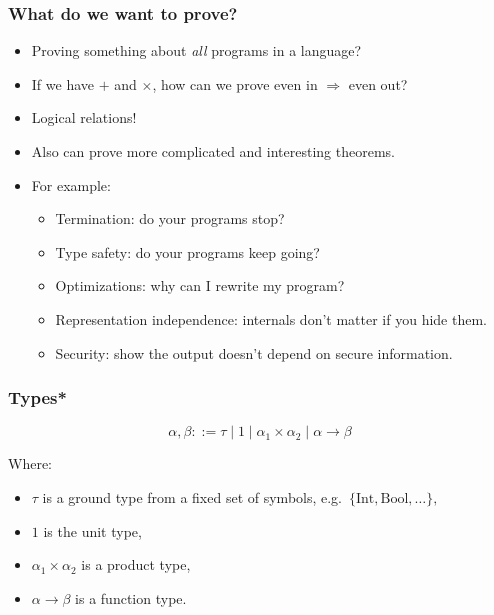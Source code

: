 \documentclass[aspectratio=169]{beamer}
\begin{document}
\begin{frame}
\frametitle{What do we want to prove?}

\pause
\begin{itemize}
    \item Proving something about \emph{all} programs in a language?
    \pause
    \item If we have $+$ and $\times$, how can we prove even in $\Rightarrow$ even out?
    \pause
    \item Logical relations!
    \pause
    \item Also can prove more complicated and interesting theorems.
    \pause
    \item For example:
    \begin{itemize}
        \pause
        \item Termination: do your programs stop?
        \pause
        \item Type safety: do your programs keep going?
        \pause
        \item Optimizations: why can I rewrite my program?
        \pause
        \item Representation independence: internals don't matter if you hide them.
        \pause
        \item Security: show the output doesn't depend on secure information.
    \end{itemize}
\end{itemize}
\end{frame}

\begin{frame}
\frametitle{Types*}

\pause

\[
\alpha, \beta ::= \tau \mid 1 \mid \alpha_1 \times \alpha_2 \mid \alpha \rightarrow \beta
\]

\pause
Where:
\begin{itemize}
    \item $\tau$ is a ground type from a fixed set of symbols, e.g.\ $\{\text{Int}, \text{Bool}, \ldots\},$
    \pause
    \item $1$ is the unit type,
    \pause
    \item $\alpha_1 \times \alpha_2$ is a product type,
    \pause
    \item $\alpha \rightarrow \beta$ is a function type.
\end{itemize}
\end{frame}
\end{document}
